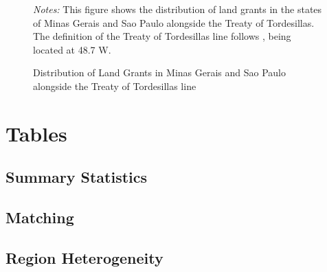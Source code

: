 \documentclass{article}
\begin{document}
\begin{landscape}
\begin{figure}
  \caption{Distribution of Land Grants in Minas Gerais and Sao Paulo alongside the Treaty of Tordesillas line}
  \begin{center}
  \end{center}
  \textit{Notes:} This figure shows the distribution of land grants in the states of Minas Gerais and Sao Paulo alongside the Treaty of Tordesillas. The definition of the Treaty of Tordesillas line follows \textcite{Laudares2022-vy}, being located at 48.7 W.
  \label{fig:Tordesillas}
\end{figure}
\end{landscape}

\clearpage

\section*{Tables}

\subsection{Summary Statistics}





\clearpage

\subsection{Matching}



\subsection{Region Heterogeneity}


\end{document}
